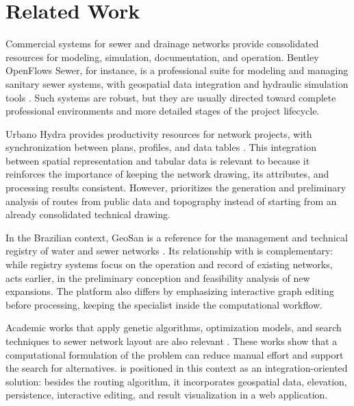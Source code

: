 \section{Related Work}\label{sec:related_work}

Commercial systems for sewer and drainage networks provide consolidated resources for modeling, simulation, documentation, and operation.
Bentley OpenFlows Sewer, for instance, is a professional suite for modeling and managing sanitary sewer systems, with geospatial data integration and hydraulic simulation tools \cite{bentley2024}.
Such systems are robust, but they are usually directed toward complete professional environments and more detailed stages of the project lifecycle.

Urbano Hydra provides productivity resources for network projects, with synchronization between plans, profiles, and data tables \cite{peterschinegg}.
This integration between spatial representation and tabular data is relevant to \method because it reinforces the importance of keeping the network drawing, its attributes, and processing results consistent.
However, \method prioritizes the generation and preliminary analysis of routes from public data and topography instead of starting from an already consolidated technical drawing.

In the Brazilian context, GeoSan is a reference for the management and technical registry of water and sewer networks \cite{nexusgeosan}.
Its relationship with \method is complementary: while registry systems focus on the operation and record of existing networks, \method acts earlier, in the preliminary conception and feasibility analysis of new expansions.
The platform also differs by emphasizing interactive graph editing before processing, keeping the specialist inside the computational workflow.

Academic works that apply genetic algorithms, optimization models, and search techniques to sewer network layout are also relevant \cite{haghighi2012,weng2014,rodrigues2020}.
These works show that a computational formulation of the problem can reduce manual effort and support the search for alternatives.
\method is positioned in this context as an integration-oriented solution: besides the routing algorithm, it incorporates geospatial data, elevation, persistence, interactive editing, and result visualization in a web application.
